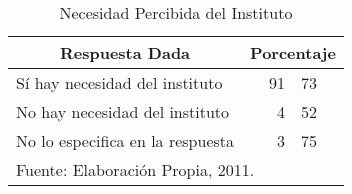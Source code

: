 \begin{table}[h!]
    \caption{Necesidad Percibida del Instituto}
    \label{tbl:Encuesta:Necesidad}
    \centering
    \begin{tabular}{l|r@{.}l@{\%}}
	    \multicolumn{1}{c|}{Respuesta Dada} &
	    	\multicolumn{2}{c}{Porcentaje} \\
	    \hline
	    \hline
	    Sí hay necesidad del instituto   & 91 & 73 \\
	    No hay necesidad del instituto   &  4 & 52 \\
	    No lo especifica en la respuesta &  3 & 75 \\
	    \hline
	    \multicolumn{3}{l}{\footnotesize Fuente: Elaboración Propia, 2011.}
    \end{tabular}
\end{table}
